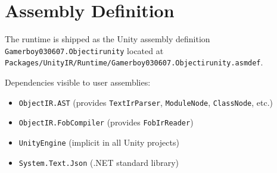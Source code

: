\documentclass[11pt,a4paper]{article}
\newcommand{\code}[1]{\texttt{\small #1}}
\newcommand{\typename}[1]{\textcolor{typecolor}{\texttt{\small #1}}}
\begin{document}
\section{Assembly Definition}

The runtime is shipped as the Unity assembly definition
\texttt{Gamerboy030607.Objectirunity} located at\\
\texttt{Packages/UnityIR/Runtime/Gamerboy030607.Objectirunity.asmdef}.

Dependencies visible to user assemblies:
\begin{itemize}[leftmargin=2em, noitemsep]
  \item \code{ObjectIR.AST} (provides \typename{TextIrParser}, \typename{ModuleNode},
        \typename{ClassNode}, etc.)
  \item \code{ObjectIR.FobCompiler} (provides \typename{FobIrReader})
  \item \code{UnityEngine} (implicit in all Unity projects)
  \item \code{System.Text.Json} (.NET standard library)
\end{itemize}
\end{document}
